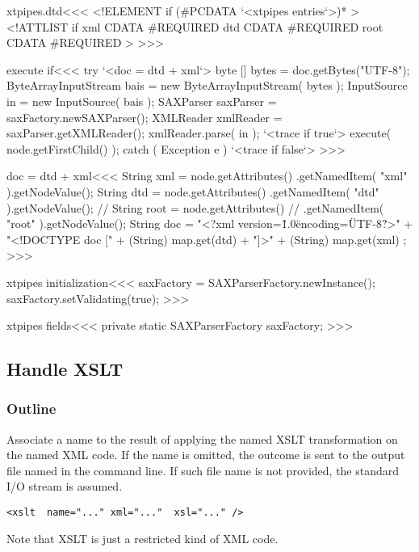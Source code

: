 \documentclass{article}
\begin{document}
{\<xtpipes.dtd\><<<
<!ELEMENT if (#PCDATA `<xtpipes entries`>)* >
<!ATTLIST if
          xml CDATA #REQUIRED
          dtd CDATA #REQUIRED
          root CDATA #REQUIRED
>
>>>

\<execute if\><<<
try{
   `<doc = dtd + xml`>
   byte [] bytes = doc.getBytes("UTF-8");
   ByteArrayInputStream bais = new ByteArrayInputStream( bytes );
   InputSource in = new InputSource( bais );
   SAXParser saxParser = saxFactory.newSAXParser();
   XMLReader xmlReader = saxParser.getXMLReader();
   xmlReader.parse( in );
   `<trace if true`>
   execute( node.getFirstChild() );
} catch ( Exception e ){ `<trace if false`> }
>>>


\<doc = dtd + xml\><<<
String xml = node.getAttributes()
                 .getNamedItem( "xml" ).getNodeValue();
String dtd = node.getAttributes()
                 .getNamedItem( "dtd" ).getNodeValue();
// String root = node.getAttributes()
//                 .getNamedItem( "root" ).getNodeValue();
String doc = "<?xml version=\"1.0\" encoding=\"UTF-8\" ?>\n"
             + "<!DOCTYPE doc [\n"
             + (String) map.get(dtd)
             + "\n]>\n"
             + (String) map.get(xml) ;
>>>



\<xtpipes initialization\><<<
saxFactory = SAXParserFactory.newInstance();
saxFactory.setValidating(true);
>>>


\<xtpipes fields\><<<
private static SAXParserFactory saxFactory;
>>>


\subsection{Handle XSLT}

\subsubsection{Outline}

Associate a name to the result of applying the named XSLT
transformation on the named XML code.  If the name is omitted, the
outcome is sent to the output file named in the command line. If such
file name is not provided, the standard I/O stream is assumed.


\begin{verbatim}
<xslt  name="..." xml="..."  xsl="..." />
\end{verbatim}

Note that XSLT is just a restricted kind of XML code.



}
\end{document}
